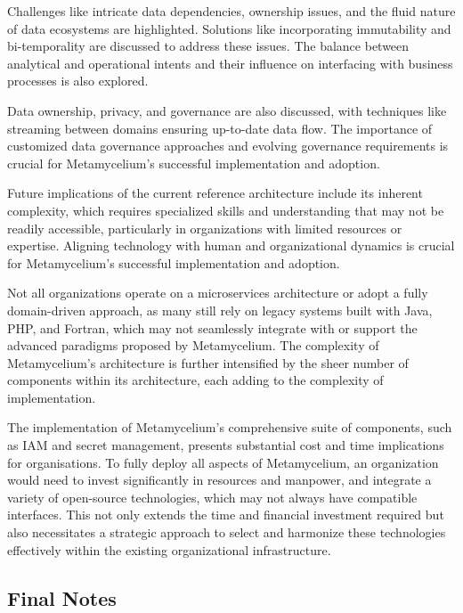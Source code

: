 \documentclass[journal]{IEEEtran}
\begin{document}
Challenges like intricate data dependencies, ownership issues, and the fluid nature of data ecosystems are highlighted. Solutions like incorporating immutability and bi-temporality are discussed to address these issues. The balance between analytical and operational intents and their influence on interfacing with business processes is also explored.

Data ownership, privacy, and governance are also discussed, with techniques like streaming between domains ensuring up-to-date data flow. The importance of customized data governance approaches and evolving governance requirements is crucial for Metamycelium's successful implementation and adoption.

Future implications of the current reference architecture include its inherent complexity, which requires specialized skills and understanding that may not be readily accessible, particularly in organizations with limited resources or expertise. Aligning technology with human and organizational dynamics is crucial for Metamycelium's successful implementation and adoption.

Not all organizations operate on a microservices architecture or adopt a fully domain-driven approach, as many still rely on legacy systems built with Java, PHP, and Fortran, which may not seamlessly integrate with or support the advanced paradigms proposed by Metamycelium. The complexity of Metamycelium's architecture is further intensified by the sheer number of components within its architecture, each adding to the complexity of implementation.

The implementation of Metamycelium's comprehensive suite of components, such as IAM and secret management, presents substantial cost and time implications for organisations. To fully deploy all aspects of Metamycelium, an organization would need to invest significantly in resources and manpower, and integrate a variety of open-source technologies, which may not always have compatible interfaces. This not only extends the time and financial investment required but also necessitates a strategic approach to select and harmonize these technologies effectively within the existing organizational infrastructure.

\subsection{Final Notes} \label{sec:discussion}
\end{document}

